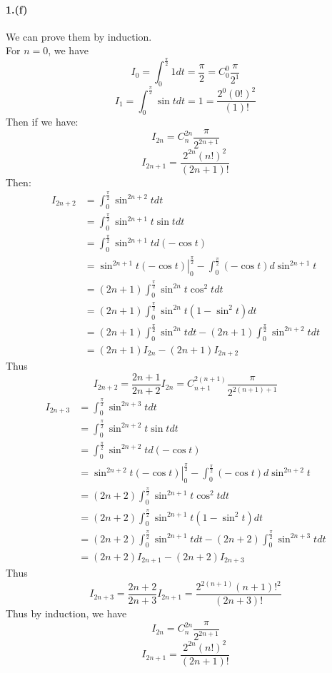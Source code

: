 \documentclass{article}
\begin{document}
\paragraph[short]{1.(f)}
{
We can prove them by induction.\\
For $n=0$, we have
$$I_0=\int_{0}^{\frac{\pi}{2}}1 dt=\frac{\pi}{2}=C^0_0\frac{\pi}{2^1}$$
$$I_1=\int_{0}^{\frac{\pi}{2}}\sin t dt=1=\frac{2^0(0!)^2}{(1)!}$$
Then if we have:
$$I_{2n}=C^{2n}_n\frac{\pi}{2^{2n+1}}$$
$$I_{2n+1}=\frac{2^{2n}(n!)^2}{(2n+1)!}$$
Then:
\begin{align*}
    I_{2n+2}&=\int_{0}^{\frac{\pi}{2}}\sin^{2n+2}t dt\\
    &=\int_{0}^{\frac{\pi}{2}}\sin^{2n+1}t\sin t dt\\
    &=\int_{0}^{\frac{\pi}{2}}\sin^{2n+1}t d(-\cos t)\\
    &=\left.\sin^{2n+1}t(-\cos t)\right|_{0}^{\frac{\pi}{2}}-\int_{0}^{\frac{\pi}{2}}(-\cos t)d\sin^{2n+1}t\\
    &=(2n+1)\int_{0}^{\frac{\pi}{2}}\sin^{2n}t\cos^2t dt\\
    &=(2n+1)\int_{0}^{\frac{\pi}{2}}\sin^{2n}t(1-\sin^2t) dt\\
    &=(2n+1)\int_{0}^{\frac{\pi}{2}}\sin^{2n}t dt-(2n+1)\int_{0}^{\frac{\pi}{2}}\sin^{2n+2}t dt\\
    &=(2n+1)I_{2n}-(2n+1)I_{2n+2}
\end{align*}
Thus
$$I_{2n+2}=\frac{2n+1}{2n+2}I_{2n}=C^{2(n+1)}_{n+1}\frac{\pi}{2^{2(n+1)+1}}$$
\begin{align*}
    I_{2n+3}&=\int_{0}^{\frac{\pi}{2}}\sin^{2n+3}t dt\\
    &=\int_{0}^{\frac{\pi}{2}}\sin^{2n+2}t\sin t dt\\
    &=\int_{0}^{\frac{\pi}{2}}\sin^{2n+2}t d(-\cos t)\\
    &=\left.\sin^{2n+2}t(-\cos t)\right|_{0}^{\frac{\pi}{2}}-\int_{0}^{\frac{\pi}{2}}(-\cos t)d\sin^{2n+2}t\\
    &=(2n+2)\int_{0}^{\frac{\pi}{2}}\sin^{2n+1}t\cos^2t dt\\
    &=(2n+2)\int_{0}^{\frac{\pi}{2}}\sin^{2n+1}t(1-\sin^2t) dt\\
    &=(2n+2)\int_{0}^{\frac{\pi}{2}}\sin^{2n+1}t dt-(2n+2)\int_{0}^{\frac{\pi}{2}}\sin^{2n+3}t dt\\
    &=(2n+2)I_{2n+1}-(2n+2)I_{2n+3}
\end{align*}
Thus
$$I_{2n+3}=\frac{2n+2}{2n+3}I_{2n+1}=\frac{2^{2(n+1)}(n+1)!^2}{(2n+3)!}$$
Thus by induction, we have
$$I_{2n}=
C^{2n}_n\frac{\pi}{2^{2n+1}}$$
$$I_{2n+1}=\frac{2^{2n}(n!)^2}{(2n+1)!}$$
}
\end{document}
